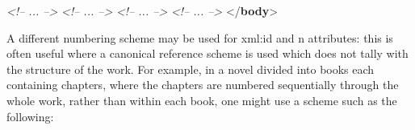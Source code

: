 \documentclass[11pt,twoside]{article}\makeatletter
\begin{document}
\begin{shaded}
\textit{<!-- ... -->}\mbox{}\newline 
\hspace*{1em}\hspace*{1em}\mbox{}\newline 
\hspace*{1em}\hspace*{1em}\mbox{}\newline 
\textit{<!-- ... -->}\mbox{}\newline 
\hspace*{1em}\hspace*{1em}\mbox{}\newline 
\hspace*{1em}\mbox{}\newline 
\textit{<!-- ... -->}\mbox{}\newline 
{}\mbox{}\newline 
{}\mbox{}\newline 
\textit{<!-- ... -->}\mbox{}\newline 
{}\mbox{}\newline 
{</\textbf{body}>}\end{shaded}\egroup\par \par A different numbering scheme may be used for xml:id and
n attributes: this is often useful where a canonical
reference scheme is used which does not tally with the structure of
the work.  For example, in a novel divided into books each containing
chapters, where the chapters are numbered sequentially through the
whole work, rather than within each book, one might use a scheme such
as the following:
\end{document}
